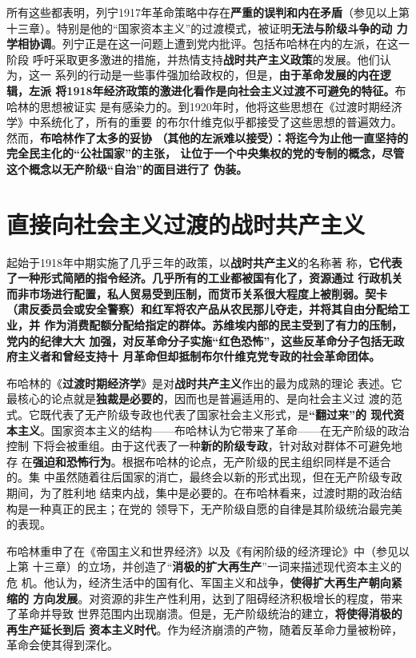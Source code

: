 所有这些都表明，列宁1917年革命策略中存在\textbf{严重的误判和内在矛盾}（参见以上第
十三章）。特别是他的“国家资本主义”的过渡模式，被证明\textbf{无法与阶级斗争的动
  力学相协调}。列宁正是在这一问题上遭到党内批评。包括布哈林在内的左派，在这一阶段
呼吁采取更多激进的措施，并热情支持\textbf{战时共产主义政策}的发展。他们认为，这一
系列的行动是一些事件强加给政权的，但是，\textbf{由于革命发展的内在逻辑，左派
  将1918年经济政策的激进化看作是向社会主义过渡不可避免的特征。}布哈林的思想被证实
是有感染力的。到1920年时，他将这些思想在《过渡时期经济学》中系统化了，所有的重要
的布尔什维克似乎都接受了这些思想的普遍效力。然而，\textbf{布哈林作了太多的妥协
  （其他的左派难以接受）：将迄今为止他一直坚持的完全民主化的“公社国家”的主张，
  让位于一个中央集权的党的专制的概念，尽管这个概念以无产阶级“自治”的面目进行了
  伪装。}

\section{直接向社会主义过渡的战时共产主义}

起始于1918年中期实施了几乎三年的政策，以\textbf{战时共产主义}的名称著
称，\textbf{它代表了一种形式简陋的指令经济。几乎所有的工业都被国有化了，资源通过
  行政机关而非市场进行配置，私人贸易受到压制，而货币关系很大程度上被削弱。契卡
  （肃反委员会或安全警察）和红军将农产品从农民那儿夺走，并将其自由分配给工业，并
  作为消费配额分配给指定的群体。苏维埃内部的民主受到了有力的压制，党内的纪律大大
  加强，对反革命分子实施“红色恐怖”，这些反革命分子包括无政府主义者和曾经支持十
  月革命但却抵制布尔什维克党专政的社会革命团体。}

布哈林的《\textbf{过渡时期经济学}》是对\textbf{战时共产主义}作出的最为成熟的理论
表述。它最核心的论点就是\textbf{独裁是必要的}，因而也是普遍适用的、是向社会主义过
渡的范式。它既代表了无产阶级专政也代表了国家社会主义形式，是\textbf{“翻过来”的
  现代资本主义}。国家资本主义的结构——布哈林认为它带来了革命——在无产阶级的政治控制
下将会被重组。由于这代表了一种\textbf{新的阶级专政}，针对敌对群体不可避免地存
在\textbf{强迫和恐怖行为}。根据布哈林的论点，无产阶级的民主组织同样是不适合的。集
中虽然随着往后国家的消亡，最终会以新的形式出现，但在无产阶级专政期间，为了胜利地
结束内战，集中是必要的。在布哈林看来，过渡时期的政治结构是一种真正的民主；在党的
领导下，无产阶级自愿的自律是其阶级统治最完美的表现。

布哈林重申了在《帝国主义和世界经济》以及《有闲阶级的经济理论》中（参见以上第
十三章）的立场，并创造了“\textbf{消极的扩大再生产}”一词来描述现代资本主义的危
机。他认为，经济生活中的国有化、军国主义和战争，\textbf{使得扩大再生产朝向紧缩的
方向发展}。对资源的非生产性利用，达到了阻碍经济积极增长的程度，带来了革命并导致
世界范围内出现崩溃。但是，无产阶级统治的建立，\textbf{将使得消极的再生产延长到后
资本主义时代}。作为经济崩溃的产物，随着反革命力量被粉碎，革命会使其得到深化。

